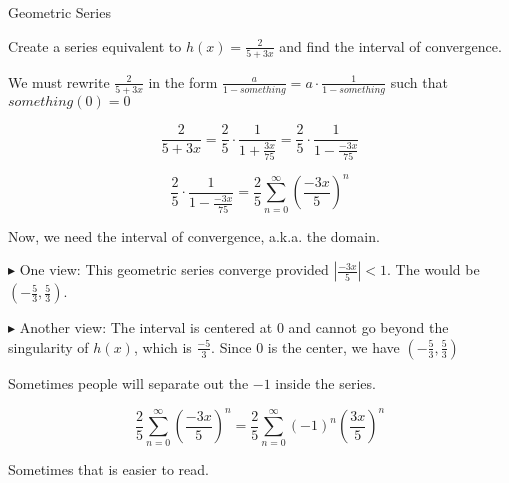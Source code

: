 \documentclass{ximera}
\begin{document}
\begin{example} Geometric Series



Create a series equivalent to $h(x) = \frac{2}{5 + 3x}$ and find the interval of convergence.



\begin{explanation}


We must rewrite $\frac{2}{5 + 3x}$ in the form $\frac{a}{1-something} = a \cdot \frac{1}{1-something}$ such that $something(0) = 0$




\[     \frac{2}{5 + 3x}  =   \frac{2}{5} \cdot \frac{1}{1 + \frac{3x}{75}}  =   \frac{2}{5} \cdot \frac{1}{1 - \frac{-3x}{75}}  \]



\[  \frac{2}{5} \cdot \frac{1}{1 - \frac{-3x}{75}}=  \frac{2}{5} \sum\limits_{n=0}^{\infty} \left(\frac{-3x}{5}\right)^n       \]





Now, we need the interval of convergence, a.k.a. the domain.  


$\blacktriangleright$ One view:  This geometric series converge provided   $\left| \frac{-3x}{5} \right| < 1$.  The would be $\left(-\frac{5}{3}, \frac{5}{3} \right)$.



$\blacktriangleright$ Another view: The interval is centered at $0$ and cannot go beyond the singularity of $h(x)$, which is $\frac{-5}{3}$.  Since $0$ is the center, we have $\left(-\frac{5}{3}, \frac{5}{3} \right)$


\end{explanation}


Sometimes people will separate out the $-1$ inside the series.

\[  \frac{2}{5} \sum\limits_{n=0}^{\infty} \left(\frac{-3x}{5}\right)^n    =   \frac{2}{5} \sum\limits_{n=0}^{\infty} (-1)^n \left(\frac{3x}{5}\right)^n   \]


Sometimes that is easier to read.


\end{example}
\end{document}
